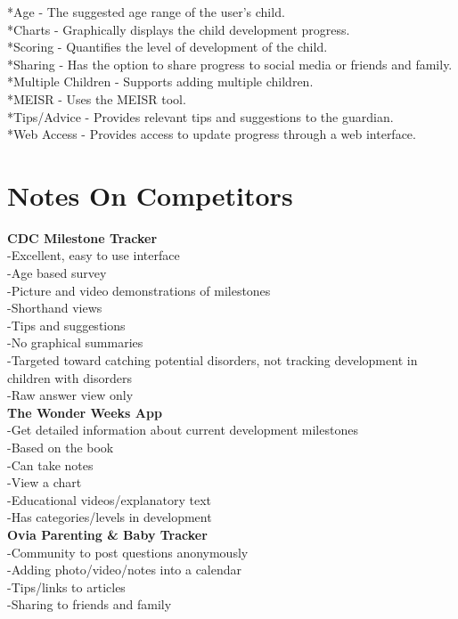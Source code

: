 *Age - The suggested age range of the user’s child.\\
*Charts - Graphically displays the child development progress.\\
*Scoring - Quantifies the level of development of the child.\\
*Sharing - Has the option to share progress to social media or friends and family.\\
*Multiple Children - Supports adding multiple children.\\
*MEISR - Uses the MEISR tool.\\
*Tips/Advice - Provides relevant tips and suggestions to the guardian.\\
*Web Access - Provides access to update progress through a web interface.
\pagebreak
\section{Notes On Competitors}
\textbf{CDC Milestone Tracker}\\
	-Excellent, easy to use interface\\
	-Age based survey\\
	-Picture and video demonstrations of milestones\\
	-Shorthand views\\
	-Tips and suggestions\\
	-No graphical summaries\\
	-Targeted toward catching potential disorders, not tracking development in children with disorders\\
	-Raw answer view only\\

\textbf{The Wonder Weeks App}\\
	-Get detailed information about current development milestones\\
	-Based on the book\\
    -Can take notes\\
	-View a chart\\
	-Educational videos/explanatory text\\
	-Has categories/levels in development\\

\textbf{Ovia Parenting \& Baby Tracker}\\
	-Community to post questions anonymously\\
	-Adding photo/video/notes into a calendar\\
	-Tips/links to articles\\
	-Sharing to friends and family\\

